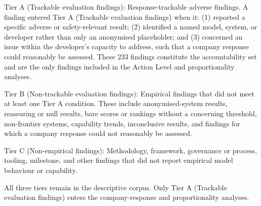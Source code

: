 \documentclass{article}
\begin{document}
Tier A (Trackable evaluation findings): Response-trackable adverse findings. A finding entered Tier A (Trackable evaluation findings) when it: (1) reported a specific adverse or safety-relevant result; (2) identified a named model, system, or developer rather than only an anonymised placeholder; and (3) concerned an issue within the developer's capacity to address, such that a company response could reasonably be assessed. These 233 findings constitute the accountability set and are the only findings included in the Action Level and proportionality analyses.

Tier B (Non-trackable evaluation findings): Empirical findings that did not meet at least one Tier A condition. These include anonymised-system results, reassuring or null results, bare scores or rankings without a concerning threshold, non-frontier systems, capability trends, inconclusive results, and findings for which a company response could not reasonably be assessed.

Tier C (Non-empirical findings): Methodology, framework, governance or process, tooling, milestone, and other findings that did not report empirical model behaviour or capability.

All three tiers remain in the descriptive corpus. Only Tier A (Trackable evaluation findings) enters the company-response and proportionality analyses.
\end{document}
